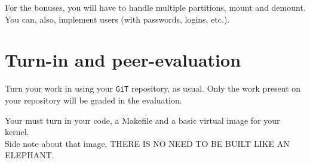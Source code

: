 \documentclass{42-en}
\begin{document}
    For the bonuses, you will have to handle multiple partitions, mount and
    demount.\\
    You can, also, implement users (with passwords, logins, etc.).


\chapter{Turn-in and peer-evaluation}
    Turn your work in using your \texttt{GiT} repository, as
    usual. Only the work present on your repository will be graded in the
    evaluation.

    Your must turn in your code, a Makefile and a basic virtual image for your
    kernel.\\
    Side note about that image, THERE IS NO NEED TO BE BUILT LIKE AN ELEPHANT.


\end{document}

